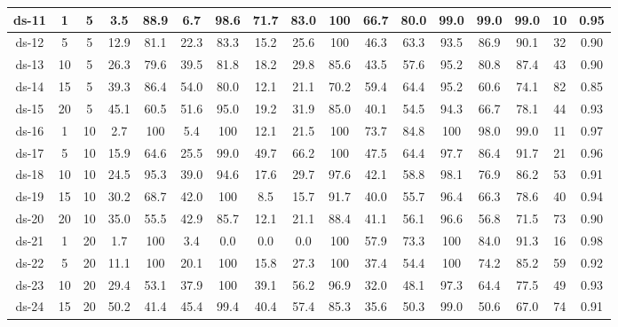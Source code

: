 \begin{table*}[h]
\begin{tabular}{|c|c|c|c|c|c|c|c|c|c|c|c|c|c|c|c|c|}
		\midrule
		ds-11 & 1     & 5     & 3.5   & 88.9  & 6.7   & 98.6  & 71.7  & 83.0  & 100 & 66.7  & 80.0  & 99.0  & 99.0  & 99.0  & 10    & 0.95 \\
		\midrule
		ds-12 & 5     & 5     & 12.9  & 81.1  & 22.3  & 83.3  & 15.2  & 25.6  & 100 & 46.3  & 63.3  & 93.5  & 86.9  & 90.1  & 32    & 0.90 \\
		\midrule
		ds-13 & 10    & 5     & 26.3  & 79.6  & 39.5  & 81.8  & 18.2  & 29.8  & 85.6  & 43.5  & 57.6  & 95.2  & 80.8  & 87.4  & 43    & 0.90 \\
		\midrule
		ds-14 & 15    & 5     & 39.3  & 86.4  & 54.0  & 80.0  & 12.1  & 21.1  & 70.2  & 59.4  & 64.4  & 95.2  & 60.6  & 74.1  & 82    & 0.85 \\
		\midrule
		ds-15 & 20    & 5     & 45.1  & 60.5  & 51.6  & 95.0  & 19.2  & 31.9  & 85.0  & 40.1  & 54.5  & 94.3  & 66.7  & 78.1  & 44    & 0.93 \\
		\midrule
		ds-16 & 1     & 10    & 2.7   & 100 & 5.4   & 100 & 12.1  & 21.5  & 100 & 73.7  & 84.8  & 100 & 98.0  & 99.0  & 11    & 0.97 \\
		\midrule
		ds-17 & 5     & 10    & 15.9  & 64.6  & 25.5  & 99.0  & 49.7  & 66.2  & 100 & 47.5  & 64.4  & 97.7  & 86.4  & 91.7  & 21    & 0.96 \\
		\midrule
		ds-18 & 10    & 10    & 24.5  & 95.3  & 39.0  & 94.6  & 17.6  & 29.7  & 97.6  & 42.1  & 58.8  & 98.1  & 76.9  & 86.2  & 53    & 0.91 \\
		\midrule
		ds-19 & 15    & 10    & 30.2  & 68.7  & 42.0  & 100 & 8.5   & 15.7  & 91.7  & 40.0  & 55.7  & 96.4  & 66.3  & 78.6  & 40    & 0.94 \\
		\midrule
		ds-20 & 20    & 10    & 35.0  & 55.5  & 42.9  & 85.7  & 12.1  & 21.1  & 88.4  & 41.1  & 56.1  & 96.6  & 56.8  & 71.5  & 73    & 0.90 \\
		\midrule
		ds-21 & 1     & 20    & 1.7   & 100 & 3.4   & 0.0   & 0.0   & 0.0   & 100 & 57.9  & 73.3  & 100 & 84.0  & 91.3  & 16    & 0.98 \\
		\midrule
		ds-22 & 5     & 20    & 11.1  & 100 & 20.1  & 100 & 15.8  & 27.3  & 100 & 37.4  & 54.4  & 100 & 74.2  & 85.2  & 59    & 0.92 \\
		\midrule
		ds-23 & 10    & 20    & 29.4  & 53.1  & 37.9  & 100 & 39.1  & 56.2  & 96.9  & 32.0  & 48.1  & 97.3  & 64.4  & 77.5  & 49    & 0.93 \\
		\midrule
		ds-24 & 15    & 20    & 50.2  & 41.4  & 45.4  & 99.4  & 40.4  & 57.4  & 85.3  & 35.6  & 50.3  & 99.0  & 50.6  & 67.0  & 74    & 0.91 \\

\end{tabular}
\end{table*}
